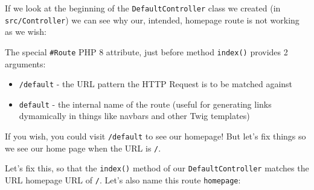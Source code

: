 \documentclass[a4paperpaper,openright]{book}
\newenvironment{Shaded}{}{}
\newcommand{\CommentTok}[1]{\textcolor[rgb]{0.38,0.63,0.69}{\textit{#1}}}
\newcommand{\KeywordTok}[1]{\textcolor[rgb]{0.00,0.44,0.13}{\textbf{#1}}}
\newcommand{\NormalTok}[1]{#1}
\newcommand{\OtherTok}[1]{\textcolor[rgb]{0.00,0.44,0.13}{#1}}
\newcommand{\StringTok}[1]{\textcolor[rgb]{0.25,0.44,0.63}{#1}}
\providecommand{\tightlist}{%
  \setlength{\itemsep}{0pt}\setlength{\parskip}{0pt}}
\begin{document}
If we look at the beginning of the \texttt{DefaultController} class we
created (in \texttt{src/Controller}) we can see why our, intended,
homepage route is not working as we wish:

\begin{Shaded}
\end{Shaded}

The special \texttt{\#Route} PHP 8 attribute, just before method
\texttt{index()} provides 2 arguments:

\begin{itemize}
\tightlist
\item
  \texttt{/default} - the URL pattern the HTTP Request is to be matched
  against
\item
  \texttt{default} - the internal name of the route (useful for
  generating links dymamically in things like navbars and other Twig
  templates)
\end{itemize}

If you wish, you could visit \texttt{/default} to see our homepage! But
let's fix things so we see our home page when the URL is \texttt{/}.

Let's fix this, so that the \texttt{index()} method of our
\texttt{DefaultController} matches the URL homepage URL of \texttt{/}.
Let's also name this route \texttt{homepage}:
\end{document}
